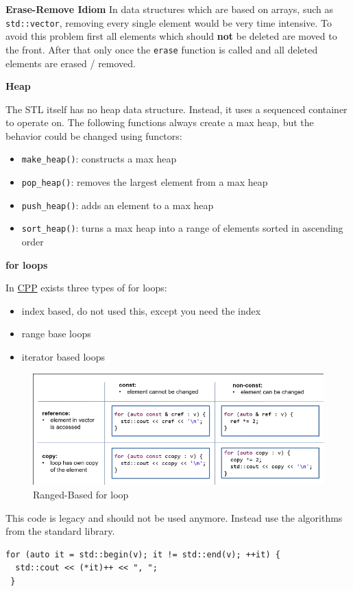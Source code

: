 \documentclass[11pt,twoside,landscape]{article}
\begin{document}
\begin{multicols}{3}
\textbf{Erase-Remove Idiom}
In data structures which are based on arrays, such as \texttt{std::vector}, removing every single element would be very time intensive.
To avoid this problem first all elements which should \textbf{not} be deleted are moved to the front.
After that only once the \texttt{erase} function is called and all deleted elements are erased / removed.

\textbf{Heap}

The STL itself has no heap data structure.
Instead, it uses a sequenced container to operate on.
The following functions always create a max heap, but the behavior could be changed using functors:
\begin{itemize}
\item \texttt{make\_heap()}: constructs a max heap
\item \texttt{pop\_heap()}: removes the largest element from a max heap
\item \texttt{push\_heap()}: adds an element to a max heap
\item \texttt{sort\_heap()}: turns a max heap into a range of elements sorted in ascending order
\end{itemize}

\textbf{for loops}

In \href{../../../roam/20210920103243-c.org}{CPP} exists three types of for loops:
\begin{itemize}
\item index based, do not used this, except you need the index
\item range base loops
\item iterator based loops
\end{itemize}

\begin{figure}[htbp]
\centering
\includegraphics[width=.9\linewidth]{img/ranged_based_for_loop.png}
\caption{\label{fig:org0e32882}Ranged-Based for loop}
\end{figure}


This code is legacy and should not be used anymore.
Instead use the algorithms from the standard library.
\lstset{language=c++,label= ,caption= ,captionpos=b,numbers=none}
\begin{lstlisting}
for (auto it = std::begin(v); it != std::end(v); ++it) {
  std::cout << (*it)++ << ", ";
 }
\end{lstlisting}


\end{multicols}
\end{document}
